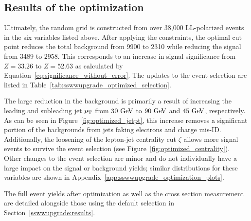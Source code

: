%
\subsection{Results of the optimization}\label{sswwupgrade:opt_results}
Ultimately, the random grid is constructed from over 38,000 LL-polarized \ssww events in the six variables listed above.
After applying the constraints, the optimal cut point reduces the total background from 9900 to 2310 while reducing the signal from 3489 to 2958.
This corresponds to an increase in signal significance from $Z = 33.26$ to $Z = 52.63$ as calculated by Equation~\ref{eq:significance_without_error}.
The updates to the event selection are listed in Table~\ref{tab:sswwupgrade_optimized_selection}. %

The large reduction in the background is primarily a result of increasing the leading and subleading jet $p_{\mathrm{T}}$ from $30\gev$ to $90\gev$ and $45\gev$, respectively.
As can be seen in Figure~\ref{fig:optimized_jetpt}, this increase removes a significant portion of the backgrounds from jets faking electrons and charge mis-ID.
Additionally, the loosening of the lepton-jet centrality cut $\zeta$ allows more signal events to survive the event selection (see Figure~\ref{fig:optimized_centrality}).
Other changes to the event selection are minor and do not individually have a large impact on the signal or background yields; similar distributions for these variables are shown in Appendix~\ref{app:sswwupgrade_optimization_plots}.

The full event yields after optimization as well as the cross section measurement are detailed alongside those using the default selection in Section~\ref{sswwupgrade:results}.

